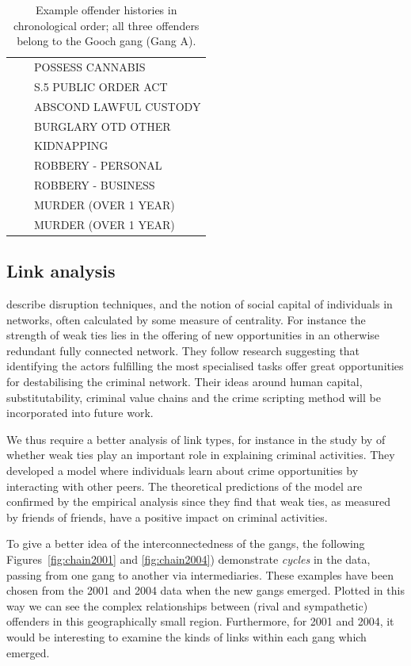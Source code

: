 \documentclass[twocolumn]{svjour3}          %
\theoremstyle{definition}
\begin{document}
\begin{table}[!ht]
{\begin{tabular}{lll}
          &       & POSSESS CANNABIS       \\
          &       & S.5 PUBLIC ORDER ACT   \\
          &       & ABSCOND LAWFUL CUSTODY \\
          &       & BURGLARY OTD OTHER     \\
          &       & KIDNAPPING             \\
          &       & ROBBERY - PERSONAL     \\
          &       & ROBBERY - BUSINESS     \\
          &       & MURDER (OVER 1 YEAR)   \\
          &       & MURDER (OVER 1 YEAR)   \\
    \end{tabular}}
 \caption{Example offender histories in chronological order; all three offenders belong to
   the Gooch gang (Gang A).}
  \label{tab:histories}
\end{table}


\subsection{Link analysis}

\citet{duijn-et-al:2014} describe disruption techniques, and the
notion of social capital of individuals in networks, often calculated
by some measure of centrality. For instance the strength of weak ties
lies in the offering of new opportunities in an otherwise redundant
fully connected network. They follow research suggesting that
identifying the actors fulfilling the most specialised tasks offer
great opportunities for destabilising the criminal network. Their
ideas around human capital, substitutability, criminal value chains
and the crime scripting method will be incorporated into future work.

We thus require a better analysis of link types, for instance in the study
by \citet{PatacchiniZenou2008} of whether weak ties play an important
role in explaining criminal activities. They developed a model where
individuals learn about crime opportunities by interacting with other
peers. The theoretical predictions of the model are confirmed by the
empirical analysis since they find that weak ties, as measured by
friends of friends, have a positive impact on criminal activities.

To give a better idea of the interconnectedness of the gangs, the
following Figures~\ref{fig:chain2001} and \ref{fig:chain2004})
demonstrate \emph{cycles} in the data, passing from one gang to
another via intermediaries.  These examples have been chosen from the
2001 and 2004 data when the new gangs emerged. Plotted in this way we
can see the complex relationships between (rival and sympathetic)
offenders in this geographically small region. Furthermore, for 2001
and 2004, it would be interesting to examine the kinds of links within
each gang which emerged.
\end{document}
